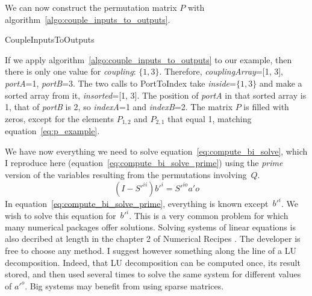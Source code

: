 We can now construct the permutation matrix $P$ with algorithm~\ref{algo:couple_inputs_to_outputs}.
\begin{algorithm}
    \caption{CoupleInputsToOutputs}
    \label{algo:couple_inputs_to_outputs}
    \begin{algorithmic}
        \ENDFOR
    \end{algorithmic}
\end{algorithm}

If we apply algorithm~\ref{algo:couple_inputs_to_outputs} to our example, then there is only one value for \textit{coupling}: $\lbrace 1, 3\rbrace$.
Therefore, \textit{couplingArray}=[1, 3], \textit{portA}=1, \textit{portB}=3.
The two calls to PortToIndex take \textit{inside}=$\lbrace 1, 3\rbrace$ and make a sorted array from it, \textit{insorted}=[1, 3].
The position of \textit{portA} in that sorted array is 1, that of \textit{portB} is 2, so \textit{indexA}=1 and \textit{indexB}=2.
The matrix $P$ is filled with zeros, except for the elements $P_{1, 2}$ and $P_{2, 1}$ that equal 1, matching equation~\eqref{eq:p_example}.

We have now everything we need to solve equation~\eqref{eq:compute_bi_solve}, which I reproduce here (equation~\eqref{eq:compute_bi_solve_prime}) using the \textit{prime} version of the variables resulting from the permutations involving~$Q$.
\begin{equation}
    (I - S'^{ii})b'^i = S'^{io}a'o \label{eq:compute_bi_solve_prime}
\end{equation}
In equation~\eqref{eq:compute_bi_solve_prime}, everything is known except~$b'^i$.
We wish to solve this equation for~$b'^i$.
This is a very common problem for which many numerical packages offer solutions.
Solving systems of linear equations is also decribed at length in the chapter 2 of Numerical Recipes \cite{Press:2007:NRE:1403886}.
The developer is free to choose any method.
I suggest however something along the line of a LU decomposition.
Indeed, that LU decomposition can be computed once, its result stored, and then used several times to solve the same system for different values of $a'^o$.
Big systems may benefit from using sparse matrices.





